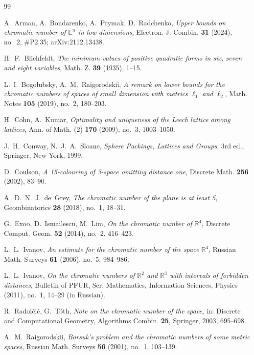 \documentclass[10pt]{article}
\theoremstyle{plain}
\theoremstyle{remark}
\newcommand{\R}{\mathbb{R}}
\newcommand{\E}{\mathbb{E}}
\begin{document}
\begin{thebibliography}{99}\small

 A.~Arman, A.~Bondarenko, A.~Prymak, D.~Radchenko,
\emph{Upper bounds on chromatic number of $\E^n$ in low dimensions},
Electron. J. Combin. \textbf{31} (2024), no.~2, \#P2.35; arXiv:2112.13438.

 H.~F.~Blichfeldt,
\emph{The minimum values of positive quadratic forms in six, seven and eight
variables}, Math. Z. \textbf{39} (1935), 1--15.

 L.~I.~Bogolubsky, A.~M.~Raigorodskii,
\emph{A remark on lower bounds for the chromatic numbers of spaces of small
dimension with metrics $\ell_1$ and $\ell_2$}, Math. Notes \textbf{105}
(2019), no.~2, 180--203.

 H.~Cohn, A.~Kumar,
\emph{Optimality and uniqueness of the Leech lattice among lattices},
Ann. of Math. (2) \textbf{170} (2009), no.~3, 1003--1050.

 J.~H.~Conway, N.~J.~A.~Sloane,
\emph{Sphere Packings, Lattices and Groups}, 3rd ed., Springer, New York,
1999.

 D.~Coulson,
\emph{A 15-colouring of 3-space omitting distance one},
Discrete Math. \textbf{256} (2002), 83--90.

 A.~D.~N.~J.~de~Grey,
\emph{The chromatic number of the plane is at least 5},
Geombinatorics \textbf{28} (2018), no.~1, 18--31.

 G.~Exoo, D.~Ismailescu, M.~Lim,
\emph{On the chromatic number of $\R^4$},
Discrete Comput. Geom. \textbf{52} (2014), no.~2, 416--423.

 L.~L.~Ivanov,
\emph{An estimate for the chromatic number of the space $\R^4$},
Russian Math. Surveys \textbf{61} (2006), no.~5, 984--986.

 L.~L.~Ivanov,
\emph{On the chromatic numbers of $\R^2$ and $\R^3$ with intervals of
forbidden distances}, Bulletin of PFUR, Ser. Mathematics, Information
Sciences, Physics (2011), no.~1, 14--29 (in Russian).

 R.~Radoi\v{c}i\'c, G.~T\'oth,
\emph{Note on the chromatic number of the space},
in: Discrete and Computational Geometry, Algorithms Combin. \textbf{25},
Springer, 2003, 695--698.

 A.~M.~Raigorodskii,
\emph{Borsuk's problem and the chromatic numbers of some metric spaces},
Russian Math. Surveys \textbf{56} (2001), no.~1, 103--139.


\end{thebibliography}
\end{document}
